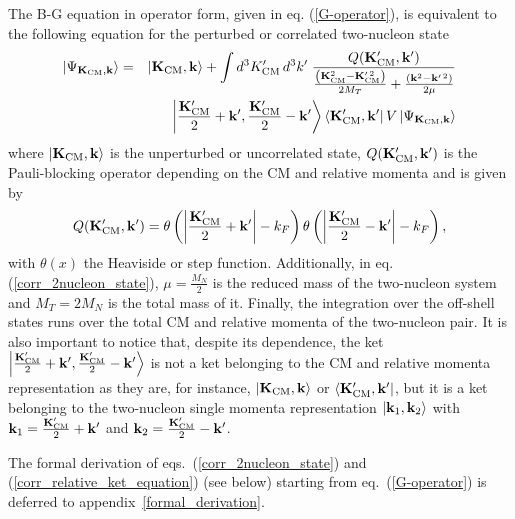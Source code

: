 \documentclass[aps,twocolumn,showpacs,preprintnumbers,amsmath,amssymb,nofootinbib,superscriptaddress,showkeys,noeprint]{revtex4-1}
\newcommand{\nk}{{\bf k}}
\newcommand{\nK}{{\bf K}}
\begin{document}
 The B-G equation in operator form, given in eq. (\ref{G-operator}),
 is equivalent to the following equation for the perturbed or
 correlated two-nucleon state
 \begin{eqnarray}
 \left| \Psi_{\nK_{\rm CM},\nk} \right\rangle &=&
 \left| \nK_{\rm CM},\nk \right\rangle + 
 \int d^3K^{\prime}_{\rm CM}\, d^3k^\prime\; 
 \frac{Q(\nK^{\prime}_{\rm CM},\nk^\prime)}{\frac{\left(
 \nK^2_{\rm CM}-\nK^{\prime\,2}_{\rm CM}\right)}{2M_T}
 +\frac{\left(\nk^2-\nk^{\prime\,2}\right)}{2\mu}}\nonumber\\
 && \left| \frac{\nK^\prime_{\rm CM}}{2}+\nk^\prime,
 \frac{\nK^\prime_{\rm CM}}{2}-\nk^\prime \right\rangle
\left\langle \nK^\prime_{\rm CM},\nk^\prime\right| V 
 \left| \Psi_{\nK_{\rm CM},\nk} \right\rangle \label{corr_2nucleon_state}
 \end{eqnarray}
 where $ \left| \nK_{\rm CM},\nk \right\rangle$ is the unperturbed or
 uncorrelated state, $Q(\nK^\prime_{\rm CM},\nk^\prime)$ is the
 Pauli-blocking operator depending on the CM and relative momenta and
 is given by
 \begin{equation}\label{Q_CM_rel_momenta}
 Q(\nK^\prime_{\rm CM},\nk^\prime)=
 \theta\left(\left|\frac{\nK^\prime_{\rm CM}}{2}+\nk^\prime \right| - k_F \right)
 \theta\left(\left|\frac{\nK^\prime_{\rm CM}}{2}-\nk^\prime \right| - k_F \right),
 \end{equation}
 with $\theta(x)$ the Heaviside or step function. Additionally, in
 eq. (\ref{corr_2nucleon_state}), $\mu=\frac{M_N}{2}$ is the reduced
 mass of the two-nucleon system and $M_T=2M_N$ is the total mass of
 it. Finally, the integration over the off-shell states runs over the
 total CM and relative momenta of the two-nucleon pair. It is also
 important to notice that, despite its dependence, the ket $\left|
 \frac{\nK^\prime_{\rm CM}}{2}+\nk^\prime, \frac{\nK^\prime_{\rm
     CM}}{2}-\nk^\prime \right\rangle$ is not a ket belonging to the
 CM and relative momenta representation as they are, for instance,
 $\left| \nK_{\rm CM},\nk \right\rangle$ or $\left\langle
 \nK^\prime_{\rm CM},\nk^\prime\right|$, but it is a ket belonging to
 the two-nucleon single momenta representation $\left| \nk_1,\nk_2
 \right\rangle$ with $\nk_1=\frac{\nK^\prime_{\rm CM}}{2}+\nk^\prime$
 and $\nk_2= \frac{\nK^\prime_{\rm CM}}{2}-\nk^\prime$.

 The formal derivation of eqs.~(\ref{corr_2nucleon_state}) and
 (\ref{corr_relative_ket_equation}) (see below) starting from
 eq.~(\ref{G-operator}) is deferred to
 appendix~\ref{formal_derivation}.
 
\end{document}
